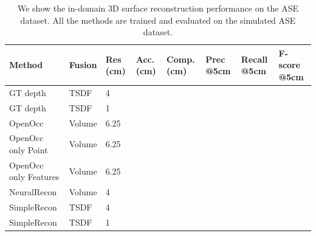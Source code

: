 \begin{table}[]
\centering
\small
\begin{tabular}{|p{2cm}|l|p{1cm}|p{1cm}|p{1cm}|p{1cm}|p{1cm}|p{1.1cm}|}
\hline
Method     & Fusion        & Res (cm) & Acc. (cm) & Comp. (cm) & Prec @5cm & Recall @5cm & F-score @5cm\\ \hline
GT depth   & TSDF       & 4                     &                &                  &         &      &   \\ \hline
GT depth   & TSDF        & 1                     &                &                   &         &       &   \\ \hline
OpenOcc & Volume        & 6.25                     &                 &                    &          &      &    \\ \hline
OpenOcc \newline only Point & Volume        & 6.25                    &                 &                    &          &       &    \\ \hline
OpenOcc \newline only Features & Volume        & 6.25                    &                 &                    &          &       &    \\ \hline
NeuralRecon & Volume          & 4                     &                 &                   &          &       &    \\ \hline
SimpleRecon & TSDF          & 4                     &                 &                   &          &       &    \\ \hline
SimpleRecon & TSDF          & 1                     &                 &                   &          &       &    \\ \hline


\end{tabular}
\caption{We show the in-domain 3D surface reconstruction performance on the ASE dataset. All the methods are trained and evaluated on the simulated ASE dataset.}
\end{table}

